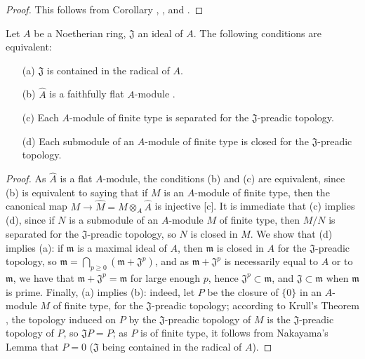 \begin{proof}
This follows from Corollary , , and .
\end{proof}

\begin{corollary}[7.3.5]
\label{0.7.3.5}
Let $A$ be a Noetherian ring, $\mathfrak{J}$ an ideal of $A$. The following conditions are
equivalent:
\begin{enumerate}
  \item[{\rm(a)}] $\mathfrak{J}$ is contained in the radical of $A$.
  \item[{\rm(b)}] $\widehat{A}$ is a faithfully flat $A$-module .
  \item[{\rm(c)}] Each $A$-module of finite type is separated for the $\mathfrak{J}$-preadic topology.
  \item[{\rm(d)}] Each submodule of an $A$-module of finite type is closed for the $\mathfrak{J}$-preadic topology.
\end{enumerate}
\end{corollary}

\begin{proof}
As $\widehat{A}$ is a flat $A$-module, the conditions (b) and (c) are equivalent, since
(b) is equivalent to saying that if $M$ is an $A$-module of finite type, then the canonical
map $M\to\widehat{M}=M\otimes_A\widehat{A}$ is injective [c].
It is immediate that (c) implies (d), since if $N$ is a submodule of an $A$-module $M$ of
finite type, then $M/N$ is separated for the $\mathfrak{J}$-preadic topology, so $N$ is
closed in $M$. We show that (d) implies (a): if $\mathfrak{m}$ is a maximal ideal of $A$,
then $\mathfrak{m}$ is closed in $A$ for the $\mathfrak{J}$-preadic topology, so
$\mathfrak{m}=\bigcap_{p\geq 0}(\mathfrak{m}+\mathfrak{J}^p)$, and as
$\mathfrak{m}+\mathfrak{J}^p$ is necessarily equal to $A$ or to $\mathfrak{m}$, we have that
$\mathfrak{m}+\mathfrak{J}^p=\mathfrak{m}$ for large enough $p$,
hence $\mathfrak{J}^p\subset\mathfrak{m}$, and $\mathfrak{J}\subset\mathfrak{m}$ when
$\mathfrak{m}$ is prime. Finally, (a) implies (b): indeed, let $P$ be the closure of $\{0\}$
in an $A$-module $M$ of finite type, for the $\mathfrak{J}$-preadic topology; according to
Krull's Theorem , the topology induced on $P$ by the
$\mathfrak{J}$-preadic topology of $M$ is the $\mathfrak{J}$-preadic topology of $P$,
so $\mathfrak{J}P=P$; as $P$ is of finite type, it follows from Nakayama's Lemma that
$P=0$ ($\mathfrak{J}$ being contained in the radical of $A$).
\end{proof}

